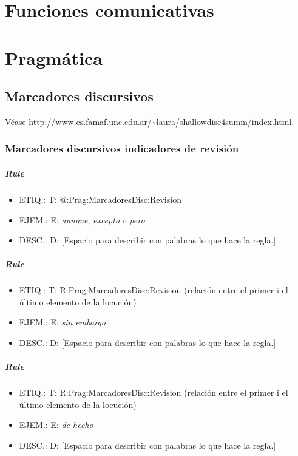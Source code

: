 \documentclass[11pt]{report}
\begin{document}
\chapter{Funciones comunicativas}
\chapter{Pragmática}
\section{Marcadores discursivos}
Véase \url{http://www.cs.famaf.unc.edu.ar/~laura/shallowdisc4summ/index.html}.

\subsection{Marcadores discursivos indicadores de revisión}
\paragraph*{Rule}
\begin{itemize}
\item ETIQ.:  T: @:Prag:MarcadoresDisc:Revision
\item EJEM.:  E: \emph{aunque}, \emph{excepto} o \emph{pero}
\item DESC.:  D: [Espacio para describir con palabras lo que hace la regla.]
\end{itemize}

\paragraph*{Rule}
\begin{itemize}
\item ETIQ.:  T: R:Prag:MarcadoresDisc:Revision (relación entre el primer i el último elemento de la locución)
\item EJEM.:  E: \emph{sin embargo}
\item DESC.:  D: [Espacio para describir con palabras lo que hace la regla.]
\end{itemize}

\paragraph*{Rule}
\begin{itemize}
\item ETIQ.:  T: R:Prag:MarcadoresDisc:Revision (relación entre el primer i el último elemento de la locución)
\item EJEM.:  E: \emph{de hecho}
\item DESC.:  D: [Espacio para describir con palabras lo que hace la regla.]
\end{itemize}
\end{document}
